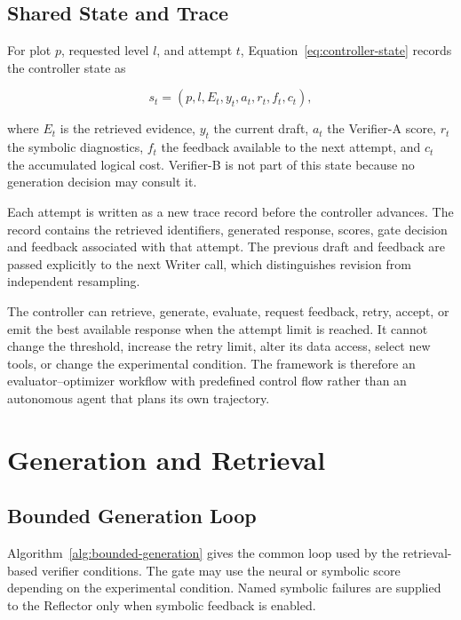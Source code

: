 \subsection{Shared State and Trace}

For plot $p$, requested level $l$, and attempt $t$, Equation~\ref{eq:controller-state} records the controller state as

\begin{equation}
s_t=(p,l,E_t,y_t,a_t,r_t,f_t,c_t),
\label{eq:controller-state}
\end{equation}

where $E_t$ is the retrieved evidence, $y_t$ the current draft, $a_t$ the Verifier-A score, $r_t$ the symbolic diagnostics, $f_t$ the feedback available to the next attempt, and $c_t$ the accumulated logical cost. Verifier-B is not part of this state because no generation decision may consult it.

Each attempt is written as a new trace record before the controller advances. The record contains the retrieved identifiers, generated response, scores, gate decision and feedback associated with that attempt. The previous draft and feedback are passed explicitly to the next Writer call, which distinguishes revision from independent resampling.

The controller can retrieve, generate, evaluate, request feedback, retry, accept, or emit the best available response when the attempt limit is reached. It cannot change the threshold, increase the retry limit, alter its data access, select new tools, or change the experimental condition. The framework is therefore an evaluator--optimizer workflow with predefined control flow rather than an autonomous agent that plans its own trajectory.

\section{Generation and Retrieval}

\subsection{Bounded Generation Loop}

Algorithm~\ref{alg:bounded-generation} gives the common loop used by the retrieval-based verifier conditions. The gate may use the neural or symbolic score depending on the experimental condition. Named symbolic failures are supplied to the Reflector only when symbolic feedback is enabled.

